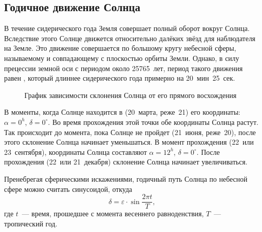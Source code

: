 \subsection{Годичное движение Солнца}
В течение сидерического года Земля совершает полный оборот вокруг Солнца. Вследствие этого Солнце движется относительно далёких звёзд для наблюдателя на Земле. Это движение совершается по большому кругу небесной сферы, называемому  и совпадающему с плоскостью орбиты Земли. Однако, в силу прецессии земной оси с периодом около 25765~лет, период такого движения равен , который длиннее сидерического года примерно на 20~мин~25~сек.

\begin{wrapfigure}[12]{r}{0.5\tw}
	\centering
	\vspace{-.9pc}
 	\caption{График зависимости склонения Солнца от его прямого восхождения}
\end{wrapfigure}
В моменты, когда Солнце находится в   (20~марта, реже~21) его координаты: $\alpha=0^h$, $\delta=0^{\circ}$. Во время прохождения этой точки обе координаты Солнца растут. Так происходит до момента, пока Солнце не пройдет  (21~июня, реже~20), после этого склонение Солнца начинает уменьшаться. В момент прохождения  (22~или 23~сентября), координаты Солнца составляют $\alpha=12^h$, $\delta=0^{\circ}$. После прохождения  (22~или 21~декабря) склонение Солнца начинает увеличиваться.

Пренебрегая сферическими искажениями, годичный путь Солнца по небесной сфере можно считать синусоидой, откуда 
\begin{equation}
\delta=\varepsilon\cdot\sin \frac{2 \pi t}{T},
\end{equation}
где $t$~--- время, прошедшее с момента весеннего равноденствия, $T$~--- тропический год.

